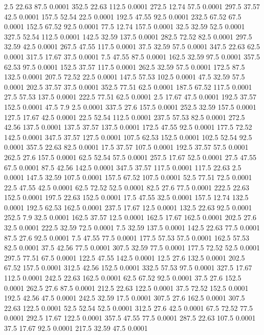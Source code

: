 2.5	22.63	87.5	0.0001
352.5	22.63	112.5	0.0001
272.5	12.74	57.5	0.0001
297.5	37.57	42.5	0.0001
157.5	52.54	22.5	0.0001
192.5	47.55	92.5	0.0001
232.5	67.52	67.5	0.0001
152.5	67.52	92.5	0.0001
77.5	12.74	157.5	0.0001
32.5	32.59	52.5	0.0001
327.5	52.54	112.5	0.0001
142.5	32.59	137.5	0.0001
282.5	72.52	82.5	0.0001
297.5	32.59	42.5	0.0001
267.5	47.55	117.5	0.0001
37.5	32.59	57.5	0.0001
347.5	22.63	62.5	0.0001
317.5	17.67	37.5	0.0001
7.5	47.55	87.5	0.0001
162.5	32.59	97.5	0.0001
357.5	62.53	97.5	0.0001
152.5	37.57	117.5	0.0001
262.5	32.59	57.5	0.0001
172.5	87.5	132.5	0.0001
207.5	72.52	22.5	0.0001
147.5	57.53	102.5	0.0001
47.5	32.59	57.5	0.0001
202.5	37.57	37.5	0.0001
352.5	77.51	62.5	0.0001
187.5	67.52	117.5	0.0001
27.5	57.53	137.5	0.0001
222.5	77.51	62.5	0.0001
2.5	17.67	47.5	0.0001
192.5	37.57	152.5	0.0001
47.5	7.9	2.5	0.0001
337.5	27.6	157.5	0.0001
252.5	32.59	157.5	0.0001
127.5	17.67	42.5	0.0001
22.5	52.54	112.5	0.0001
237.5	57.53	82.5	0.0001
272.5	42.56	137.5	0.0001
137.5	37.57	137.5	0.0001
172.5	47.55	92.5	0.0001
177.5	72.52	142.5	0.0001
347.5	37.57	127.5	0.0001
107.5	62.53	152.5	0.0001
102.5	52.54	92.5	0.0001
357.5	22.63	82.5	0.0001
17.5	37.57	107.5	0.0001
192.5	37.57	57.5	0.0001
262.5	27.6	157.5	0.0001
62.5	52.54	57.5	0.0001
257.5	17.67	52.5	0.0001
27.5	47.55	67.5	0.0001
87.5	42.56	142.5	0.0001
347.5	37.57	117.5	0.0001
117.5	22.63	2.5	0.0001
147.5	32.59	107.5	0.0001
157.5	67.52	107.5	0.0001
52.5	77.51	72.5	0.0001
22.5	47.55	42.5	0.0001
62.5	72.52	52.5	0.0001
82.5	27.6	77.5	0.0001
222.5	22.63	152.5	0.0001
197.5	22.63	152.5	0.0001
17.5	47.55	32.5	0.0001
157.5	12.74	132.5	0.0001
192.5	62.53	162.5	0.0001
237.5	17.67	12.5	0.0001
132.5	22.63	92.5	0.0001
252.5	7.9	32.5	0.0001
162.5	37.57	12.5	0.0001
162.5	17.67	162.5	0.0001
202.5	27.6	32.5	0.0001
222.5	32.59	72.5	0.0001
7.5	32.59	137.5	0.0001
142.5	22.63	77.5	0.0001
87.5	27.6	92.5	0.0001
7.5	47.55	77.5	0.0001
177.5	57.53	57.5	0.0001
162.5	57.53	82.5	0.0001
37.5	42.56	77.5	0.0001
307.5	32.59	77.5	0.0001
177.5	72.52	52.5	0.0001
297.5	77.51	67.5	0.0001
122.5	47.55	142.5	0.0001
12.5	27.6	132.5	0.0001
202.5	67.52	157.5	0.0001
312.5	42.56	152.5	0.0001
332.5	57.53	97.5	0.0001
327.5	17.67	112.5	0.0001
242.5	22.63	162.5	0.0001
62.5	67.52	92.5	0.0001
37.5	27.6	152.5	0.0001
262.5	27.6	87.5	0.0001
212.5	22.63	122.5	0.0001
37.5	72.52	152.5	0.0001
192.5	42.56	47.5	0.0001
242.5	32.59	17.5	0.0001
307.5	27.6	162.5	0.0001
307.5	22.63	122.5	0.0001
52.5	52.54	52.5	0.0001
312.5	27.6	42.5	0.0001
67.5	72.52	77.5	0.0001
292.5	17.67	122.5	0.0001
357.5	47.55	77.5	0.0001
287.5	22.63	107.5	0.0001
37.5	17.67	92.5	0.0001
217.5	32.59	47.5	0.0001
